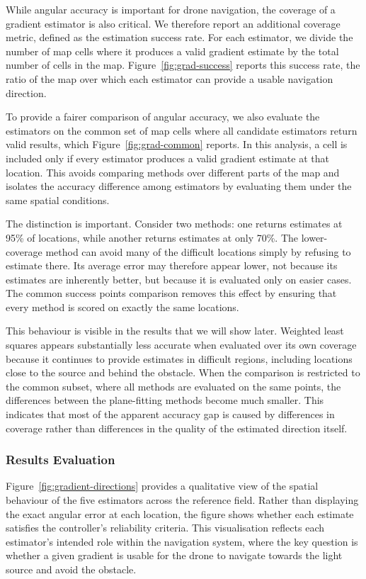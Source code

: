 While angular accuracy is important for drone navigation, the coverage of a gradient estimator is also critical. We therefore report an additional coverage metric, defined as the estimation success rate. For each estimator, we divide the number of map cells where it produces a valid gradient estimate by the total number of cells in the map. Figure~\ref{fig:grad-success} reports this success rate, the ratio of the map over which each estimator can provide a usable navigation direction.

To provide a fairer comparison of angular accuracy, we also evaluate the estimators on the common set of map cells where all candidate estimators return valid results, which Figure~\ref{fig:grad-common} reports. In this analysis, a cell is included only if every estimator produces a valid gradient estimate at that location. This avoids comparing methods over different parts of the map and isolates the accuracy difference among estimators by evaluating them under the same spatial conditions.


The distinction is important. Consider two methods: one returns estimates at 95\% of locations, while another returns estimates at only 70\%. The lower-coverage method can avoid many of the difficult locations simply by refusing to estimate there. Its average error may therefore appear lower, not because its estimates are inherently better, but because it is evaluated only on easier cases. The common success points comparison removes this effect by ensuring that every method is scored on exactly the same locations.

This behaviour is visible in the results that we will show later. Weighted least squares appears substantially less accurate when evaluated over its own coverage because it continues to provide estimates in difficult regions, including locations close to the source and behind the obstacle. When the comparison is restricted to the common subset, where all methods are evaluated on the same points, the differences between the plane-fitting methods become much smaller. This indicates that most of the apparent accuracy gap is caused by differences in coverage rather than differences in the quality of the estimated direction itself.


\subsubsection{Results Evaluation}

Figure~\ref{fig:gradient-directions} provides a qualitative view of the spatial behaviour of the five estimators across the reference field. Rather than displaying the exact angular error at each location, the figure shows whether each estimate satisfies the controller's reliability criteria. This visualisation reflects each estimator's intended role within the navigation system, where the key question is whether a given gradient is usable for the drone to navigate towards the light source and avoid the obstacle.

